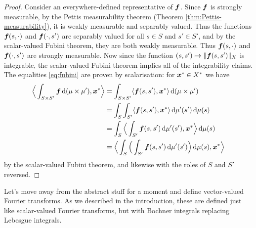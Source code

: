 \begin{proof}
  Consider an everywhere-defined representative of $\bm{f}$.
  Since $\bm{f}$ is strongly measurable, by the Pettis measurability theorem (Theorem \ref{thm:Pettis-measurability}), it is weakly measurable and separably valued.
  Thus the functions $\bm{f}(s,\cdot)$ and $\bm{f}(\cdot,s')$ are separably valued for all $s \in S$ and $s' \in S'$, and by the scalar-valued Fubini theorem, they are both weakly measurable.
  Thus $\bm{f}(s,\cdot)$ and $\bm{f}(\cdot,s')$ are strongly measurable.
  Now since the function $(s,s') \mapsto \|\bm{f}(s,s')\|_X$ is integrable, the scalar-valued Fubini theorem implies all of the integrability claims.
  The equalities \eqref{eq:fubini} are proven by scalarisation: for $\bm{x}^* \in X^*$ we have
  \begin{equation*}
    \begin{aligned}
      \Big\langle \int_{S \times S'} \bm{f} \, \mathrm{d}(\mu \times \mu') , \bm{x}^* \Big\rangle
      &= \int_{S \times S'} \langle \bm{f}(s,s'), \bm{x}^* \rangle \, \mathrm{d}(\mu \times \mu') \\
      &= \int_{S} \int_{S'} \langle \bm{f}(s,s'), \bm{x}^* \rangle \, \mathrm{d}\mu'(s') \, \mathrm{d}\mu(s) \\
      &= \int_{S} \Big\langle \int_{S'} \bm{f}(s,s') \, \mathrm{d}\mu'(s') , \bm{x}^* \Big\rangle \, \mathrm{d}\mu(s) \\
      &= \Big\langle \int_S \Big(\int_{S'} \bm{f}(s,s') \, \mathrm{d}\mu'(s') \Big)\, \mathrm{d}\mu(s) , \bm{x}^* \Big\rangle
  \end{aligned}
  \end{equation*}
  by the scalar-valued Fubini theorem, and likewise with the roles of $S$ and $S'$ reversed.
\end{proof}

Let's move away from the abstract stuff for a moment and define vector-valued Fourier transforms.
As we described in the introduction, these are defined just like scalar-valued Fourier transforms, but with Bochner integrals replacing Lebesgue integrals.

